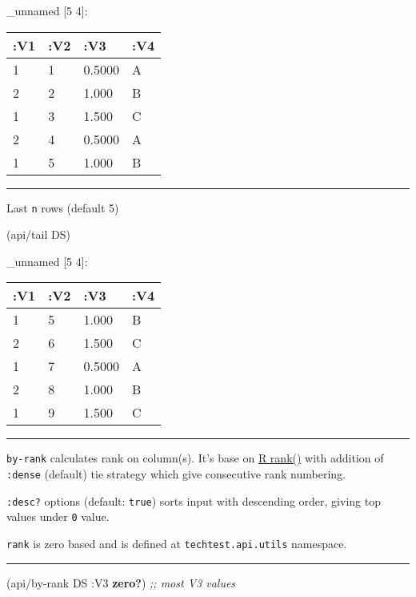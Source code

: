 \documentclass[]{article}
\newenvironment{Shaded}{\begin{snugshade}}{\end{snugshade}}
\newcommand{\KeywordTok}[1]{\textcolor[rgb]{0.13,0.29,0.53}{\textbf{#1}}}
\newcommand{\CommentTok}[1]{\textcolor[rgb]{0.56,0.35,0.01}{\textit{#1}}}
\newcommand{\AttributeTok}[1]{\textcolor[rgb]{0.77,0.63,0.00}{#1}}
\newcommand{\NormalTok}[1]{#1}
\begin{document}
\_unnamed {[}5 4{]}:

\begin{longtable}[]{@{}llll@{}}
\toprule
:V1 & :V2 & :V3 & :V4\tabularnewline
\midrule
\endhead
1 & 1 & 0.5000 & A\tabularnewline
2 & 2 & 1.000 & B\tabularnewline
1 & 3 & 1.500 & C\tabularnewline
2 & 4 & 0.5000 & A\tabularnewline
1 & 5 & 1.000 & B\tabularnewline
\bottomrule
\end{longtable}

\begin{center}\rule{0.5\linewidth}{0.5pt}\end{center}

Last \texttt{n} rows (default 5)

\begin{Shaded}
\begin{Highlighting}[]
\NormalTok{(api/tail DS)}
\end{Highlighting}
\end{Shaded}

\_unnamed {[}5 4{]}:

\begin{longtable}[]{@{}llll@{}}
\toprule
:V1 & :V2 & :V3 & :V4\tabularnewline
\midrule
\endhead
1 & 5 & 1.000 & B\tabularnewline
2 & 6 & 1.500 & C\tabularnewline
1 & 7 & 0.5000 & A\tabularnewline
2 & 8 & 1.000 & B\tabularnewline
1 & 9 & 1.500 & C\tabularnewline
\bottomrule
\end{longtable}

\begin{center}\rule{0.5\linewidth}{0.5pt}\end{center}

\texttt{by-rank} calculates rank on column(s). It's base on
\href{https://www.rdocumentation.org/packages/base/versions/3.6.1/topics/rank}{R
rank()} with addition of \texttt{:dense} (default) tie strategy which
give consecutive rank numbering.

\texttt{:desc?} options (default: \texttt{true}) sorts input with
descending order, giving top values under \texttt{0} value.

\texttt{rank} is zero based and is defined at
\texttt{techtest.api.utils} namespace.

\begin{center}\rule{0.5\linewidth}{0.5pt}\end{center}

\begin{Shaded}
\begin{Highlighting}[]
\NormalTok{(api/by-rank DS }\AttributeTok{:V3} \KeywordTok{zero?}\NormalTok{) }\CommentTok{;; most V3 values}
\end{Highlighting}
\end{Shaded}
\end{document}
